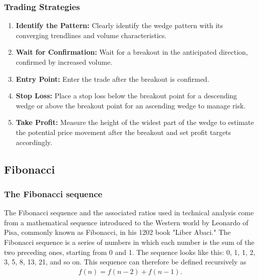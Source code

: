 \documentclass{report}
\begin{document}
     \bigbreak \noindent 
     \bigbreak \noindent 
     \subsubsection{Trading Strategies}
     \bigbreak \noindent 
     \begin{enumerate}
         \item \textbf{Identify the Pattern:} Clearly identify the wedge pattern with its converging trendlines and volume characteristics.
         \item \textbf{Wait for Confirmation:} Wait for a breakout in the anticipated direction, confirmed by increased volume.
         \item \textbf{Entry Point:} Enter the trade after the breakout is confirmed.
         \item \textbf{Stop Loss:} Place a stop loss below the breakout point for a descending wedge or above the breakout point for an ascending wedge to manage risk.
         \item \textbf{Take Profit:} Measure the height of the widest part of the wedge to estimate the potential price movement after the breakout and set profit targets accordingly.
     \end{enumerate}

     \pagebreak 
     \subsection{Fibonacci}
     \bigbreak \noindent 
     \subsubsection{The Fibonacci sequence}
     \bigbreak \noindent 
        The Fibonacci sequence and the associated ratios used in technical analysis come from a mathematical sequence introduced to the Western world by Leonardo of Pisa, commonly known as Fibonacci, in his 1202 book "Liber Abaci."
        \bigbreak \noindent 
        The Fibonacci sequence is a series of numbers in which each number is the sum of the two preceding ones, starting from 0 and 1. The sequence looks like this: 0, 1, 1, 2, 3, 5, 8, 13, 21, and so on.
        \bigbreak \noindent 
        This sequence can therefore be defined recursively as
        \begin{align*}
            f(n) = f(n-2) + f(n-1)
        .\end{align*}
\end{document}
